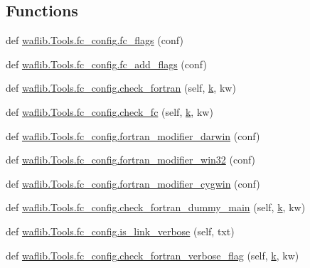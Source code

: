 \subsection*{Functions}
\begin{DoxyCompactItemize}
\item 
def \hyperlink{namespacewaflib_1_1_tools_1_1fc__config_af33dfe55223675e715096b53060fcc7b}{waflib.\+Tools.\+fc\+\_\+config.\+fc\+\_\+flags} (conf)
\item 
def \hyperlink{namespacewaflib_1_1_tools_1_1fc__config_ab8da3d423ca04bcb0605cb5b20cf1003}{waflib.\+Tools.\+fc\+\_\+config.\+fc\+\_\+add\+\_\+flags} (conf)
\item 
def \hyperlink{namespacewaflib_1_1_tools_1_1fc__config_a30df582cf9f3bd7df5e10b19cce9c1af}{waflib.\+Tools.\+fc\+\_\+config.\+check\+\_\+fortran} (self, \hyperlink{rfft2d_test_m_l_8m_adc468c70fb574ebd07287b38d0d0676d}{k}, kw)
\item 
def \hyperlink{namespacewaflib_1_1_tools_1_1fc__config_a6a20ecee9e371876b4ed84bbdf2ef5b2}{waflib.\+Tools.\+fc\+\_\+config.\+check\+\_\+fc} (self, \hyperlink{rfft2d_test_m_l_8m_adc468c70fb574ebd07287b38d0d0676d}{k}, kw)
\item 
def \hyperlink{namespacewaflib_1_1_tools_1_1fc__config_ac18fad0b284649afcff955dbda86ecfc}{waflib.\+Tools.\+fc\+\_\+config.\+fortran\+\_\+modifier\+\_\+darwin} (conf)
\item 
def \hyperlink{namespacewaflib_1_1_tools_1_1fc__config_a1ede54d90c65d29ab988d3c396f41c09}{waflib.\+Tools.\+fc\+\_\+config.\+fortran\+\_\+modifier\+\_\+win32} (conf)
\item 
def \hyperlink{namespacewaflib_1_1_tools_1_1fc__config_aa38ff3fd4c6e527bbb7694fb926be843}{waflib.\+Tools.\+fc\+\_\+config.\+fortran\+\_\+modifier\+\_\+cygwin} (conf)
\item 
def \hyperlink{namespacewaflib_1_1_tools_1_1fc__config_ad62948bfb2feb67956cd041be08f7dd8}{waflib.\+Tools.\+fc\+\_\+config.\+check\+\_\+fortran\+\_\+dummy\+\_\+main} (self, \hyperlink{rfft2d_test_m_l_8m_adc468c70fb574ebd07287b38d0d0676d}{k}, kw)
\item 
def \hyperlink{namespacewaflib_1_1_tools_1_1fc__config_a65edef95fa138e1a9780be8e33eb6bf0}{waflib.\+Tools.\+fc\+\_\+config.\+is\+\_\+link\+\_\+verbose} (self, txt)
\item 
def \hyperlink{namespacewaflib_1_1_tools_1_1fc__config_a1476da254937f14613e25a63aa40e95e}{waflib.\+Tools.\+fc\+\_\+config.\+check\+\_\+fortran\+\_\+verbose\+\_\+flag} (self, \hyperlink{rfft2d_test_m_l_8m_adc468c70fb574ebd07287b38d0d0676d}{k}, kw)

\end{DoxyCompactItemize}
